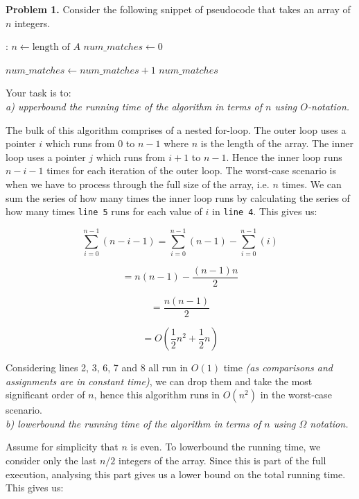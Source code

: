 \documentclass[12pt]{article}
\newenvironment{pseudocode}
{
  \mdframed
  \algorithmic[1]
}
{
  \endalgorithmic
  \endmdframed
}
\newcommand{\problem}[1]{\noindent \textbf{Problem #1.}}
\begin{document}
\problem{1}  Consider the following snippet of pseudocode that takes an array of $n$ integers. 

\begin{pseudocode}
    :
    \State $n \gets \text{length of } A$
    \State $num\_matches \gets 0$
    
                \State $num\_matches \gets num\_matches + 1$
            \EndIf
        \EndFor
    \EndFor
    \State \Return $num\_matches$
    \EndFunction
\end{pseudocode}

Your task is to: \\

\textit{ a) upperbound the running time of the algorithm in terms of $n$ using $O$-notation.}

The bulk of this algorithm comprises of a nested for-loop. The outer loop uses a pointer $i$ which runs from $0$ to $n-1$ where $n$ is the length of the array. The inner loop uses a pointer $j$ which runs from $i+1$ to $n-1$. Hence the inner loop runs $n-i-1$ times for each iteration of the outer loop.
The worst-case scenario is when we have to process through the full size of the array, i.e. $n$ times.
We can sum the series of how many times the inner loop runs by calculating the series of how many times \texttt{line 5} runs for each value of $i$ in \texttt{line 4}. This gives us:

$$\sum_{i=0}^{n-1} (n-i-1) = \sum_{i=0}^{n-1} (n-1) - \sum_{i=0}^{n-1} (i)$$

$$= n(n-1) - \frac{(n-1)n}{2}$$

$$= \frac{n(n-1)}{2}$$

$$=O(\frac{1}{2}n^{2} + \frac{1}{2}n)$$

Considering lines 2, 3, 6, 7 and 8 all run in $O(1)$ time \textit{(as comparisons and assignments are in constant time)}, we can drop them and take the most significant order of $n$, hence this algorithm runs in $O(n^2)$ in the worst-case scenario. \\

\textit{b) lowerbound the running time of the algorithm in terms of $n$ using $\Omega$ notation.}

Assume for simplicity that $n$ is even. To lowerbound the running time, we consider only the last $n/2$ integers of the array. Since this is part of the full execution, analysing this part gives us a lower bound on the total running time. This gives us:
\end{document}
